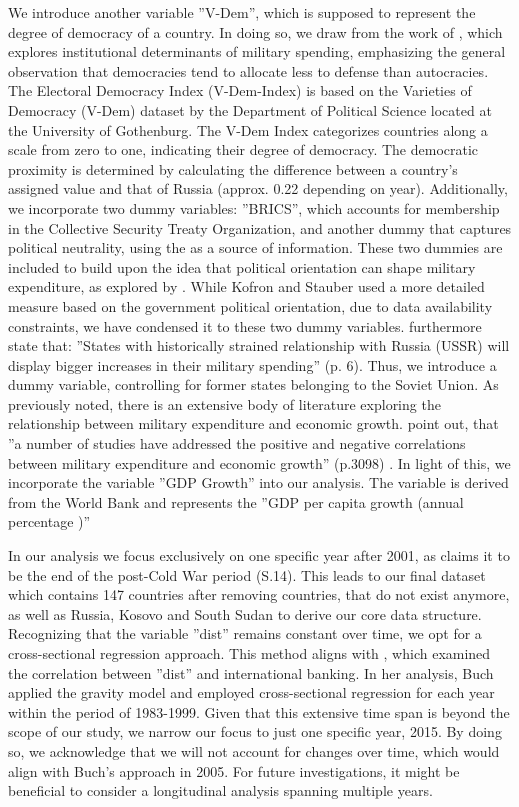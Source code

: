 \documentclass[12pt,a4paper]{article}
\begin{document}
We introduce another variable ''V-Dem'', which is supposed to represent the degree of democracy of a country. In doing so, we draw from the work of \citet{albalate2012}, which explores institutional determinants of military spending, emphasizing the general observation that democracies tend to allocate less to defense than autocracies. The Electoral Democracy Index (V-Dem-Index) is based on the Varieties of Democracy (V-Dem) dataset \citep{VDEM} by the Department of Political Science located at the University of Gothenburg. The V-Dem Index categorizes countries along a scale from zero to one, indicating their degree of democracy. The democratic proximity is determined by calculating the difference between a country’s assigned value and that of Russia (approx. 0.22 depending on year). Additionally, we incorporate two dummy variables: ''BRICS'', which accounts for membership in the Collective Security Treaty Organization, and another dummy that captures political neutrality, using the \citet{World} as a source of information. These two dummies are included to build upon the idea that political orientation can shape military expenditure, as explored by \citet{kofrovn2023}. While Kofron and Stauber used a more detailed measure based on the government political orientation, due to data availability constraints, we have condensed it to these two dummy variables. \citet{kofrovn2023} furthermore state that: ''States with historically strained relationship with Russia (USSR) will display bigger increases in their military spending'' (p. 6). Thus, we introduce a dummy variable, controlling for former states belonging to the Soviet Union. As previously noted, there is an extensive body of literature exploring the relationship between military expenditure and economic growth. \citet{lin2019} point out, that ''a number of studies have addressed the positive and negative correlations between military expenditure and economic growth'' (p.3098) . In light of this, we incorporate the variable ''GDP Growth'' into our analysis. The variable is derived from the World Bank and represents the ''GDP per capita growth (annual percentage )''


In our analysis we focus exclusively on one specific year after 2001, as \citet{gray2005} claims it to be the end of the post-Cold War period (S.14). This leads to our final dataset which contains 147 countries after removing countries, that do not exist anymore, as well as Russia, Kosovo and South Sudan to derive our core data structure. Recognizing that the variable ''dist'' remains constant over time, we opt for a cross-sectional regression approach. This method aligns with \citet{buch2005}, which examined the correlation between ''dist'' and international banking. In her analysis, Buch applied the gravity model and employed cross-sectional regression for each year within the period of 1983-1999. Given that this extensive time span is beyond the scope of our study, we narrow our focus to just one specific year, 2015. By doing so, we acknowledge that we will not account for changes over time, which would align with Buch's approach in 2005. For future investigations, it might be beneficial to consider a longitudinal analysis spanning multiple years. 
\end{document}

